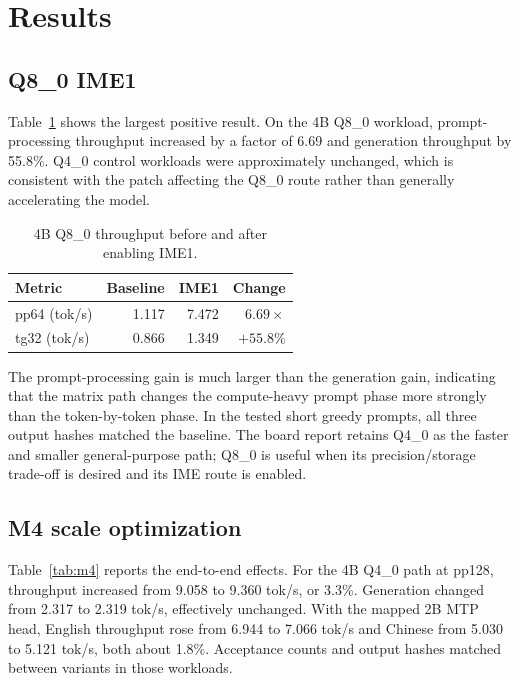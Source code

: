 \documentclass[10pt,twocolumn]{article}
\begin{document}
\section{Results}
\subsection{Q8\_0 IME1}
Table~\ref{tab:q8} shows the largest positive result. On the 4B Q8\_0 workload, prompt-processing throughput increased by a factor of 6.69 and generation throughput by 55.8\%. Q4\_0 control workloads were approximately unchanged, which is consistent with the patch affecting the Q8\_0 route rather than generally accelerating the model.

\begin{table}[t]
\centering
\caption{4B Q8\_0 throughput before and after enabling IME1.}
\label{tab:q8}
\begin{tabular}{lrrr}
\toprule
Metric & Baseline & IME1 & Change \\
\midrule
pp64 (tok/s) & 1.117 & 7.472 & $6.69\times$ \\
tg32 (tok/s) & 0.866 & 1.349 & $+55.8\%$ \\
\bottomrule
\end{tabular}
\end{table}

The prompt-processing gain is much larger than the generation gain, indicating that the matrix path changes the compute-heavy prompt phase more strongly than the token-by-token phase. In the tested short greedy prompts, all three output hashes matched the baseline. The board report retains Q4\_0 as the faster and smaller general-purpose path; Q8\_0 is useful when its precision/storage trade-off is desired and its IME route is enabled.

\subsection{M4 scale optimization}
Table~\ref{tab:m4} reports the end-to-end effects. For the 4B Q4\_0 path at pp128, throughput increased from 9.058 to 9.360 tok/s, or 3.3\%. Generation changed from 2.317 to 2.319 tok/s, effectively unchanged. With the mapped 2B MTP head, English throughput rose from 6.944 to 7.066 tok/s and Chinese from 5.030 to 5.121 tok/s, both about 1.8\%. Acceptance counts and output hashes matched between variants in those workloads.

\begin{table}[t]
\centering
\caption{End-to-end effect of the M4 scale patch.}
\label{tab:m4}
\end{table}
\end{document}
